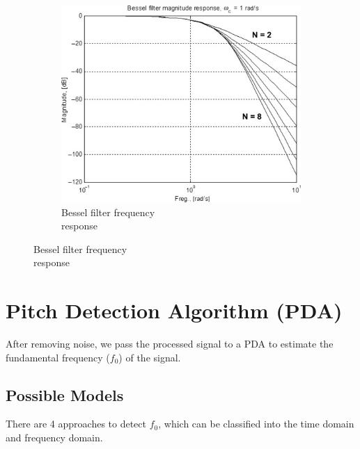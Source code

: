 \begin{figure}[h]
\begin{subfigure}{.4\textwidth}
		\includegraphics[width=1\linewidth]{Figures/bessel.jpg}
		\caption{Bessel filter frequency\\response}
		\label{fig:sub3}
	\end{subfigure}

\end{figure}

\section{Pitch Detection Algorithm (PDA)}
\label{sec:PDA}
After removing noise, we pass the processed signal to a PDA to estimate the fundamental frequency ($f_0$) of
the signal.

\subsection{Possible Models}
There are 4 approaches to detect $f_0$, which can be classified into the time domain and frequency domain.

